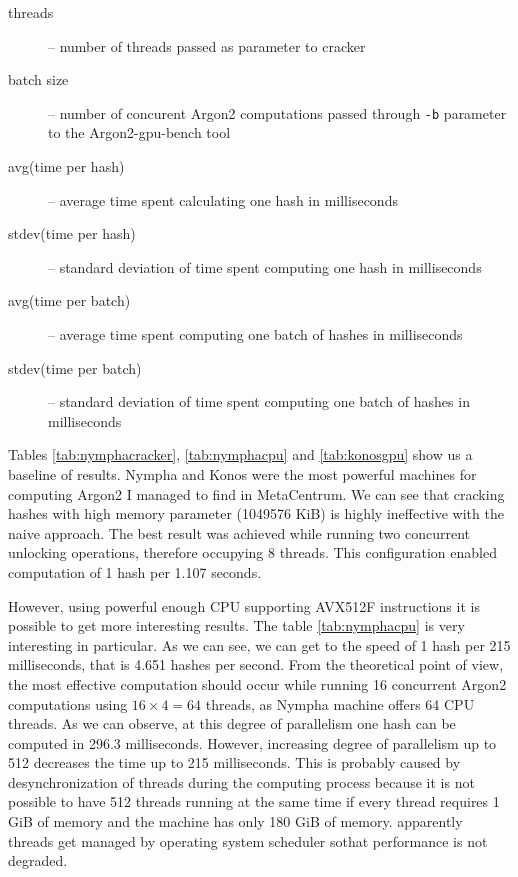 \documentclass[nolof]{fithesis3}
\begin{document}
\begin{description}
\item[threads] -- number of threads passed as parameter to cracker

\item[batch size] -- number of concurent Argon2 computations passed through \verb+-b+ parameter to the Argon2-gpu-bench tool

\item[avg(time per hash)] -- average time spent calculating one hash in milliseconds

\item[stdev(time per hash)] -- standard deviation of time spent computing one hash in milliseconds

\item[avg(time per batch)] -- average time spent computing one batch of hashes in milliseconds

\item[stdev(time per batch)] -- standard deviation of time spent computing one batch of hashes in milliseconds
\end{description}

Tables \ref{tab:nymphacracker}, \ref{tab:nymphacpu}  and \ref{tab:konosgpu} show us a baseline of results. Nympha and Konos were the most powerful machines for computing Argon2 I managed to find in MetaCentrum. We can see that cracking hashes with high memory parameter (1049576 KiB) is highly ineffective with the naive approach. The best result was achieved while running two concurrent unlocking operations, therefore occupying 8 threads. This configuration enabled computation of 1 hash per 1.107 seconds.

However, using powerful enough CPU supporting AVX512F instructions it is possible to get more interesting results. The table \ref{tab:nymphacpu} is very interesting in particular. As we can see, we can get to the speed of 1 hash per 215 milliseconds, that is 4.651 hashes per second. From the theoretical point of view, the most effective computation should occur while running 16 concurrent Argon2 computations using $16 \times 4 = 64$ threads, as Nympha machine offers 64 CPU threads. As we can observe, at this degree of parallelism one hash can be computed in 296.3 milliseconds. However, increasing degree of parallelism up to 512 decreases the time up to 215 milliseconds. This is probably caused by desynchronization of threads during the computing process because it is not possible to have 512 threads running at the same time if every thread requires 1 GiB of memory and the machine has only 180 GiB of memory. apparently threads get managed by operating system scheduler sothat performance is not degraded.
\end{document}
